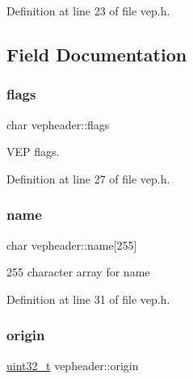 Definition at line 23 of file vep.\+h.



\subsection{Field Documentation}
\mbox{\label{a00080_ad19a09798439f6a12c5794c2ce224e9b_ad19a09798439f6a12c5794c2ce224e9b}} 
\subsubsection{\texorpdfstring{flags}{flags}}
{\footnotesize\ttfamily char vepheader\+::flags}



V\+EP flags. 



Definition at line 27 of file vep.\+h.

\mbox{\label{a00080_ab1972b24045dbe7a528c6d79ffd2a5ad_ab1972b24045dbe7a528c6d79ffd2a5ad}} 
\subsubsection{\texorpdfstring{name}{name}}
{\footnotesize\ttfamily char vepheader\+::name\mbox{[}255\mbox{]}}



255 character array for name 



Definition at line 31 of file vep.\+h.

\mbox{\label{a00080_aa81b6806dd33022ce60c314c908ba028_aa81b6806dd33022ce60c314c908ba028}} 
\subsubsection{\texorpdfstring{origin}{origin}}
{\footnotesize\ttfamily \hyperlink{a00047_a435d1572bf3f880d55459d9805097f62_a435d1572bf3f880d55459d9805097f62}{uint32\+\_\+t} vepheader\+::origin}




